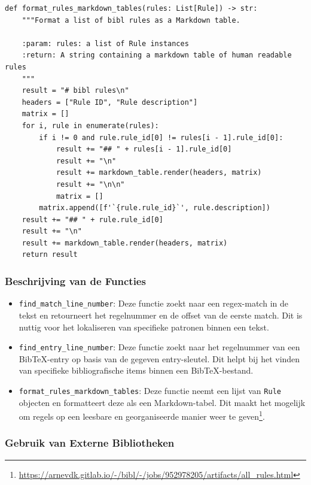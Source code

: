 \begin{verbatim}
def format_rules_markdown_tables(rules: List[Rule]) -> str:
    """Format a list of bibl rules as a Markdown table.

    :param: rules: a list of Rule instances
    :return: A string containing a markdown table of human readable rules
    """
    result = "# bibl rules\n"
    headers = ["Rule ID", "Rule description"]
    matrix = []
    for i, rule in enumerate(rules):
        if i != 0 and rule.rule_id[0] != rules[i - 1].rule_id[0]:
            result += "## " + rules[i - 1].rule_id[0]
            result += "\n"
            result += markdown_table.render(headers, matrix)
            result += "\n\n"
            matrix = []
        matrix.append([f'`{rule.rule_id}`', rule.description])
    result += "## " + rule.rule_id[0]
    result += "\n"
    result += markdown_table.render(headers, matrix)
    return result
\end{verbatim}

\subsubsection{Beschrijving van de Functies}

\begin{itemize}
    \item \texttt{find\_match\_line\_number}: Deze functie zoekt naar een regex-match in de tekst en retourneert het regelnummer en de offset van de eerste match. Dit is nuttig voor het lokaliseren van specifieke patronen binnen een tekst.
    \item \texttt{find\_entry\_line\_number}: Deze functie zoekt naar het regelnummer van een BibTeX-entry op basis van de gegeven entry-sleutel. Dit helpt bij het vinden van specifieke bibliografische items binnen een BibTeX-bestand.
    \item \texttt{format\_rules\_markdown\_tables}: Deze functie neemt een lijst van \texttt{Rule} objecten en formatteert deze als een Markdown-tabel. Dit maakt het mogelijk om regels op een leesbare en georganiseerde manier weer te geven\footnote{\url{https://arnevdk.gitlab.io/-/bibl/-/jobs/952978205/artifacts/all_rules.html}}.
\end{itemize}

\subsubsection{Gebruik van Externe Bibliotheken}

